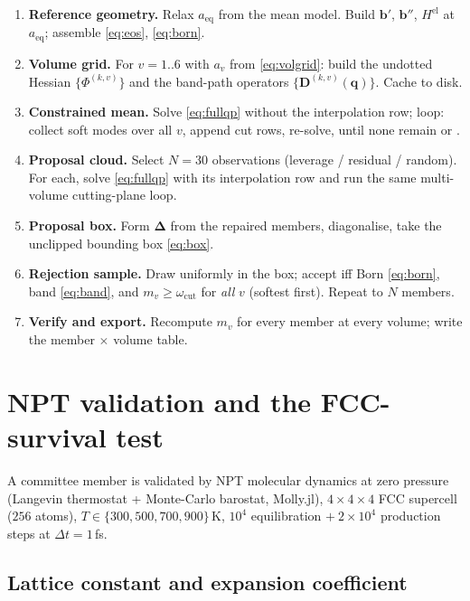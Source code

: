 \documentclass[11pt,a4paper]{article}
\newcommand{\jl}[1]{\path{#1}}
\newcommand{\aeq}{a_{\mathrm{eq}}}
\newenvironment{algsteps}{\begin{enumerate}[leftmargin=2.2em,itemsep=1pt,topsep=3pt,label=\arabic*.]}{\end{enumerate}}
\begin{document}
\begin{algorithm}[t]
\caption{Volume-resolved constrained POPS committee}
\begin{algsteps}
\item \textbf{Reference geometry.} Relax $\aeq$ from the mean model. Build $\bm b'$,
      $\bm b''$, $H^{\mathrm{el}}$ at $\aeq$; assemble \eqref{eq:eos}, \eqref{eq:born}.
\item \textbf{Volume grid.} For $v=1..6$ with $a_v$ from \eqref{eq:volgrid}: build the
      undotted Hessian $\{\Phi^{(k,v)}\}$ and the band-path operators
      $\{\bm D^{(k,v)}(\bm q)\}$. Cache to disk.
\item \textbf{Constrained mean.} Solve \eqref{eq:fullqp} without the interpolation row;
      loop: collect soft modes over all $v$, append cut rows, re-solve, until none
      remain or \jl{max_cuts}.
\item \textbf{Proposal cloud.} Select $N=30$ observations (leverage / residual /
      random). For each, solve \eqref{eq:fullqp} with its interpolation row and run the
      same multi-volume cutting-plane loop.
\item \textbf{Proposal box.} Form $\bm\Delta$ from the repaired members, diagonalise,
      take the unclipped bounding box \eqref{eq:box}.
\item \textbf{Rejection sample.} Draw uniformly in the box; accept iff Born
      \eqref{eq:born}, band \eqref{eq:band}, and $m_v\ge\omega_{\mathrm{cut}}$ for
      \emph{all} $v$ (softest first). Repeat to $N$ members.
\item \textbf{Verify and export.} Recompute $m_v$ for every member at every volume;
      write the member $\times$ volume table.
\end{algsteps}
\end{algorithm}

\section{NPT validation and the FCC-survival test}
\label{sec:npt}

A committee member is validated by NPT molecular dynamics at zero pressure (Langevin
thermostat + Monte-Carlo barostat, Molly.jl), $4\times4\times4$ FCC supercell
($256$ atoms), $T\in\{300,500,700,900\}$\,K, $10^{4}$ equilibration $+\ 2\times10^{4}$
production steps at $\Delta t=1$\,fs.

\subsection{Lattice constant and expansion coefficient}
\end{document}
